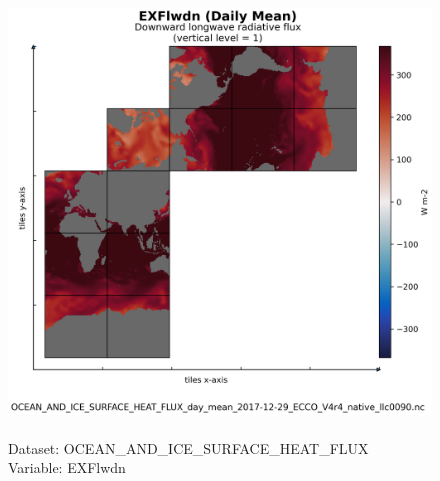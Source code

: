 \begin{figure}[H]
\centering
\includegraphics[scale=0.5]{../images/plots/native_plots/Ocean_and_Sea-Ice_Surface_Heat_Fluxes/EXFlwdn.png}
\caption{\\Dataset: OCEAN\_AND\_ICE\_SURFACE\_HEAT\_FLUX\\Variable: EXFlwdn}
\label{tab:table-OCEAN_AND_ICE_SURFACE_HEAT_FLUX_EXFlwdn-Plot}
\end{figure}
\pagebreak
